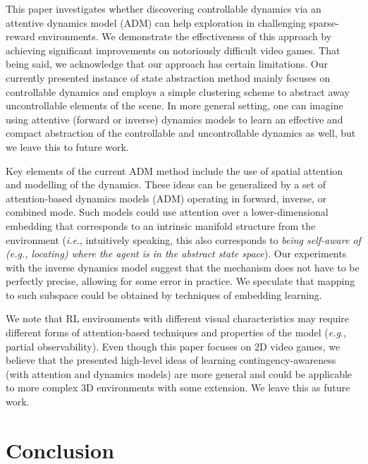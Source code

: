 \documentclass{article} \usepackage{iclr,times}
\makeatletter
\newcommand{\ADM}{{ADM}}
\DeclareRobustCommand\onedot{\futurelet\@let@token\@onedot}
\def\onedot{.}
\def\eg{\emph{e.g}\onedot} \def\Eg{\emph{E.g}\onedot}
\def\ie{\emph{i.e}\onedot} \def\Ie{\emph{I.e}\onedot}
\makeatother
\begin{document}
{This paper investigates whether discovering controllable dynamics via
an attentive dynamics model (\ADM{})
can help exploration in challenging sparse-reward environments.
We demonstrate the effectiveness of this approach by achieving significant improvements
on notoriously difficult video games. That being said, we acknowledge that our approach has certain limitations.
Our currently presented instance of state abstraction method mainly focuses on
controllable dynamics and employs a simple clustering scheme to abstract away uncontrollable elements of the scene.
In more general setting, one can imagine using attentive (forward or inverse) dynamics models
to learn an effective and compact abstraction of the controllable and uncontrollable dynamics as well,
but we leave this to future work.

Key elements of the current \ADM{} method include the use of spatial attention and modelling of the dynamics.
These ideas can be generalized by a set of attention-based dynamics models (ADM) operating in forward, inverse, or combined mode.
Such models could use attention over a lower-dimensional embedding that corresponds to an intrinsic manifold structure from the environment
(\ie, intuitively speaking, this also corresponds to \emph{being self-aware of (e.g., locating) where the agent is in the abstract state space}). Our experiments with the inverse dynamics model suggest that the mechanism does not have to be perfectly precise, allowing for some error in practice. We speculate that mapping to such subspace could be obtained by techniques of embedding learning.


We note that RL environments with different visual characteristics may require different forms of attention-based techniques and properties of the model (\eg, partial observability).
Even though this paper focuses on 2D video games, we believe that the presented high-level ideas of learning contingency-awareness (with attention and dynamics models) are more general and could be applicable to more complex 3D environments with some extension. We leave this as future work.
 




\section{Conclusion}
\label{sec:conclusion}



}
\end{document}
